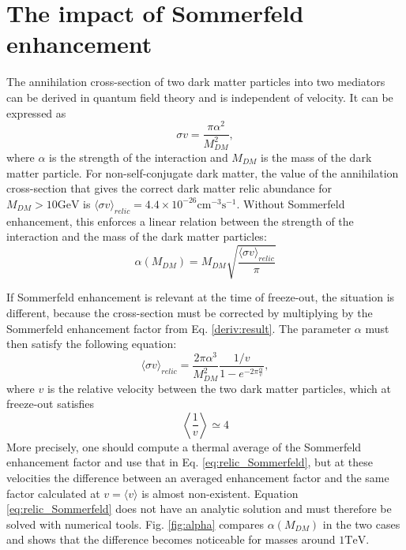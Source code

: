 \section{The impact of Sommerfeld enhancement}
The annihilation cross-section of two dark matter particles into two mediators can be derived in quantum field theory and is independent of velocity. It can be expressed as
\begin{equation}
	\sigma v = \frac{\pi \alpha^2}{M_{DM}^2},
\end{equation}
where \(\alpha\) is the strength of the interaction and \(M_{DM} \) is the mass of the dark matter particle. For non-self-conjugate dark matter, the value of the annihilation cross-section that gives the correct dark matter relic abundance for \(M_{DM} > 10 \mathrm{GeV} \) is \(\langle \sigma v \rangle _{relic}  = 4.4 \times 10^{-26} \mathrm{cm^{-3} s^{-1}}\). Without Sommerfeld enhancement, this enforces a linear relation between the strength of the interaction and the mass of the dark matter particles:
\begin{equation}
	\alpha(M_{DM} ) = M_{DM} \sqrt{\frac{\langle \sigma v \rangle _{relic}}{\pi}}
\end{equation}

If Sommerfeld enhancement is relevant at the time of freeze-out, the situation is different, because the cross-section must be corrected by multiplying by the Sommerfeld enhancement factor from Eq. \eqref{deriv:result}. The parameter \(\alpha \) must then satisfy the following equation:
\begin{equation}\label{eq:relic_Sommerfeld}
	\langle \sigma v \rangle _{relic} = \frac{2\pi \alpha ^3}{M_{DM} ^2} \frac{1 / v}{1- e^{-2\pi \frac{\alpha}{v}}},
\end{equation}
where \(v\) is the relative velocity between the two dark matter particles, which at freeze-out satisfies
\begin{equation}
	\left \langle \frac{1}{v} \right \rangle \simeq 4
\end{equation}
More precisely, one should compute a thermal average of the Sommerfeld enhancement factor and use that in Eq. \eqref{eq:relic_Sommerfeld}, but at these velocities the difference between an averaged enhancement factor and the same factor calculated at \(v= \langle v \rangle \) is almost non-existent. Equation \eqref{eq:relic_Sommerfeld} does not have an analytic solution and must therefore be solved with numerical tools. Fig. \ref{fig:alpha} compares \(\alpha (M_{DM} )\) in the two cases and shows that the difference becomes noticeable for masses around \(1 \mathrm{TeV} \).

